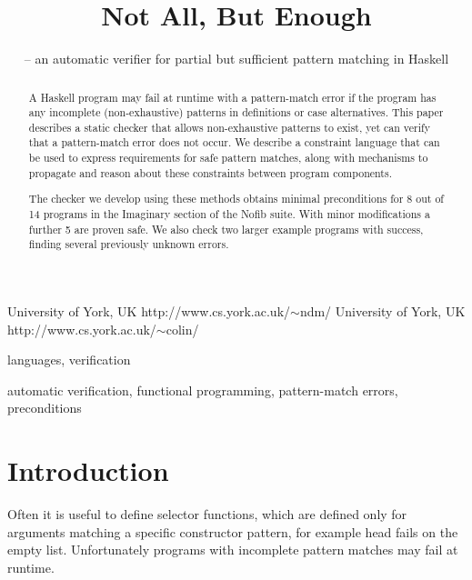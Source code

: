\documentclass[preprint]{sigplanconf}
\newcommand{\C}[1]{\textsf{#1}}
\newenvironment{discuss}
    {\noindent\hspace{-1.5mm}\vline\hspace{1mm}\vline\hspace{1mm}\begin{minipage}[h]{\linewidth}}
    {\end{minipage}}
\begin{document}
\copyrightdata{[to be supplied]}

\titlebanner{\today{} - \currenttime{}}        %
\preprintfooter{}   %

\title{Not All, But Enough}
\subtitle{ -- an automatic verifier for partial but sufficient pattern matching in Haskell}

           {University of York, UK}
           {http://www.cs.york.ac.uk/$\sim$ndm/}
           {University of York, UK}
           {http://www.cs.york.ac.uk/$\sim$colin/}

\maketitle

\begin{abstract}
A Haskell program may fail at runtime with a pattern-match error if the program has any incomplete (non-exhaustive) patterns in definitions or case alternatives. This paper describes a static checker that allows non-exhaustive patterns to exist, yet can verify that a pattern-match error does not occur. We describe a constraint language that can be used to express requirements for safe pattern matches, along with mechanisms to propagate and reason about these constraints between program components.

The checker we develop using these methods obtains minimal preconditions for 8 out of 14 programs in the Imaginary section of the Nofib suite\citep{nofib}. With minor modifications a further 5 are proven safe. We also check two larger example programs with success, finding several previously unknown errors.
\end{abstract}


\terms
languages, verification

\keywords
automatic verification, functional programming, pattern-match errors, preconditions

\section{Introduction}
\label{sec:introduction}

\begin{discuss}
Often it is useful to define selector functions, which are defined only for arguments matching a specific constructor pattern, for example \C{head} fails on the empty list. Unfortunately programs with incomplete pattern matches may fail at runtime.
\end{discuss}
\end{document}
